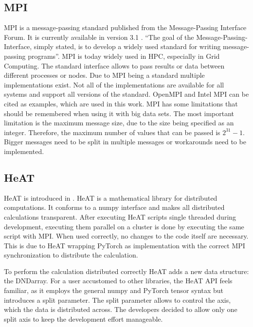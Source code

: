 \subsection{MPI}
\label{subec:mpi}
\gls{MPI} is a message-passing standard published from the Message-Passing Interface Forum. It is currently available in version 3.1 \cite{message_passing_interface_forum_mpi_2015}.
\enquote{The goal of the Message-Passing-Interface, simply stated, is to develop a widely used standard for writing message-passing programs}\cite{message_passing_interface_forum_mpi_2015}.
\gls{MPI} is today widely used in \gls{HPC}, especially in Grid Computing. The standard interface allows to pass results or data between different processes or nodes.
Due to \gls{MPI} being a standard multiple implementations exist. Not all of the implementations are available for all systems and support all versions of the standard.
OpenMPI \cite{noauthor_open_nodate} and Intel MPI \cite{noauthor_intel_nodate} can be cited as examples, which are used in this work.
\gls{MPI} has some limitations that should be remembered when using it with big data sets. The most important limitation is the maximum message size, due to the size
being specified as an integer. Therefore, the maximum number of values that can be passed is \(2^{31} - 1\). Bigger messages need to be split in multiple messages or workarounds need to be implemented.

\subsection{HeAT}
\label{subsec:heat}
\gls{HeAT} is introduced in \cite{krajsek_helmholtz_nodate}. \gls{HeAT} is a mathematical library for distributed computations.
It conforms to a \gls{numpy} \cite{noauthor_numpy_nodate} interface and makes all distributed calculations transparent.
After executing \gls{HeAT} scripts single threaded during development, executing them parallel on a cluster is done by executing the same script with \gls{MPI}.
When used correctly, no changes to the code itself are necessary.
This is due to \gls{HeAT} wrapping \gls{PyTorch} as implementation with the correct \gls{MPI} synchronization to distribute the calculation.

To perform the calculation distributed correctly \gls{HeAT} adds a new data structure: the \gls{DNDarray}.
For a user accustomed to other libraries, the \gls{HeAT} API feels familiar, as it employs the general \gls{numpy} and \gls{PyTorch} tensor syntax
but introduces a split parameter.
The split parameter allows to control the axis, which the data is distributed across.
The developers decided to allow only one split axis to keep the development effort manageable.


